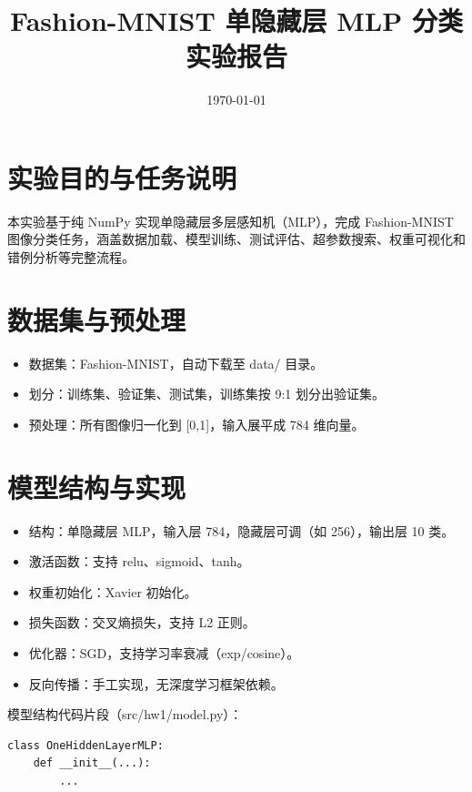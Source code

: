 \documentclass[12pt]{article}
\title{Fashion-MNIST 单隐藏层 MLP 分类实验报告}
\author{ }
\date{\today}
\begin{document}
\maketitle

\section{实验目的与任务说明}
本实验基于纯 NumPy 实现单隐藏层多层感知机（MLP），完成 Fashion-MNIST 图像分类任务，涵盖数据加载、模型训练、测试评估、超参数搜索、权重可视化和错例分析等完整流程。

\section{数据集与预处理}
\begin{itemize}
  \item 数据集：Fashion-MNIST，自动下载至 data/ 目录。
  \item 划分：训练集、验证集、测试集，训练集按 9:1 划分出验证集。
  \item 预处理：所有图像归一化到 [0,1]，输入展平成 784 维向量。
\end{itemize}

\section{模型结构与实现}
\begin{itemize}
  \item 结构：单隐藏层 MLP，输入层 784，隐藏层可调（如 256），输出层 10 类。
  \item 激活函数：支持 relu、sigmoid、tanh。
  \item 权重初始化：Xavier 初始化。
  \item 损失函数：交叉熵损失，支持 L2 正则。
  \item 优化器：SGD，支持学习率衰减（exp/cosine）。
  \item 反向传播：手工实现，无深度学习框架依赖。
\end{itemize}
模型结构代码片段（src/hw1/model.py）：
\begin{verbatim}
class OneHiddenLayerMLP:
    def __init__(...):
        ...
\end{verbatim}
\end{document}
